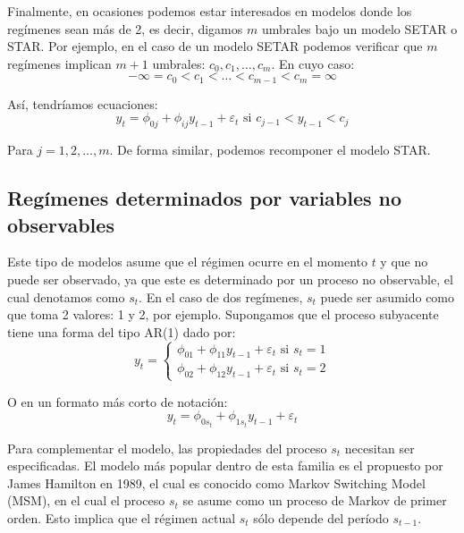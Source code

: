 \documentclass[
]{book}
\begin{document}
Finalmente, en ocasiones podemos estar interesados en modelos donde los regímenes sean más de 2, es decir, digamos \(m\) umbrales bajo un modelo SETAR o STAR. Por ejemplo, en el caso de un modelo SETAR podemos verificar que \(m\) regímenes implican \(m + 1\) umbrales: \(c_0, c_1, \ldots, c_m\). En cuyo caso:
\begin{equation*}
    -\infty = c_0 < c_1 < \ldots < c_{m-1} < c_m = \infty
\end{equation*}

Así, tendríamos ecuaciones:
\begin{equation}
    y_t = \phi_{0j} + \phi_{ij} y_{t-1} + \varepsilon_t \text{ si } c_{j-1} < y_{t-1} < c_j
\end{equation}

Para \(j = 1, 2, \ldots, m\). De forma similar, podemos recomponer el modelo STAR.

\hypertarget{reguxedmenes-determinados-por-variables-no-observables}{%
\subsection{Regímenes determinados por variables no observables}\label{reguxedmenes-determinados-por-variables-no-observables}}

Este tipo de modelos asume que el régimen ocurre en el momento \(t\) y que no puede ser observado, ya que este es determinado por un proceso no observable, el cual denotamos como \(s_t\). En el caso de dos regímenes, \(s_t\) puede ser asumido como que toma 2 valores: 1 y 2, por ejemplo. Supongamos que el proceso subyacente tiene una forma del tipo AR(1) dado por:
\begin{equation}
    y_t = 
    \begin{cases}
        \phi_{01} + \phi_{11} y_{t-1} + \varepsilon_t \text{ si } s_t = 1 \\
        \phi_{02} + \phi_{12} y_{t-1} + \varepsilon_t \text{ si } s_t = 2
    \end{cases}
    \label{eq_swching_obs}
\end{equation}

O en un formato más corto de notación:
\begin{equation}
    y_t = \phi_{0 s_t} + \phi_{1 s_t} y_{t-1} + \varepsilon_t
\end{equation}

Para complementar el modelo, las propiedades del proceso \(s_t\) necesitan ser especificadas. El modelo más popular dentro de esta familia es el propuesto por James Hamilton en 1989, el cual es conocido como Markov Switching Model (MSM), en el cual el proceso \(s_t\) se asume como un proceso de Markov de primer orden. Esto implica que el régimen actual \(s_t\) sólo depende del período \(s_{t-1}\).
\end{document}
